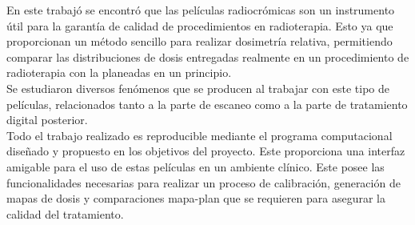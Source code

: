 En este trabajó se encontró que las películas radiocrómicas son un instrumento útil para la garantía de calidad de procedimientos en radioterapia. Esto ya que proporcionan un método sencillo para realizar dosimetría relativa, permitiendo comparar las distribuciones de dosis entregadas realmente en un procedimiento de radioterapia con la planeadas en un principio.\\

Se estudiaron diversos fenómenos que se producen al trabajar con este tipo de películas, relacionados tanto a la parte de escaneo como a la parte de tratamiento digital posterior.\\

Todo el trabajo realizado es reproducible mediante el programa computacional diseñado y propuesto en los objetivos del proyecto. Este proporciona una interfaz amigable para el uso de estas películas en un ambiente clínico. Este posee las funcionalidades necesarias para realizar un proceso de calibración, generación de mapas de dosis y comparaciones mapa-plan que se requieren para asegurar la calidad del tratamiento.\\